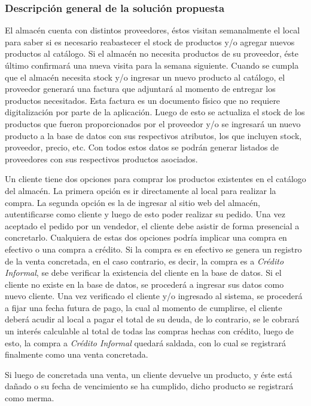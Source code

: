\documentclass[letterpaper,12pt]{article}
\begin{document}
\newpage

\subsubsection{Descripción general de la solución propuesta}

El almacén cuenta con distintos proveedores, éstos visitan semanalmente el local para saber si es necesario reabastecer el stock de 
productos y/o  agregar nuevos productos al catálogo. Si el almacén no necesita productos de su proveedor, éste último confirmará
una nueva visita para la semana siguiente. Cuando se cumpla que el almacén necesita stock y/o ingresar un nuevo producto al 
catálogo, el proveedor generará una factura que adjuntará al momento de entregar los productos necesitados. Esta factura es 
un documento físico que no requiere digitalización por parte de la aplicación. Luego de esto se actualiza el stock de los productos que 
fueron proporcionados por el proveedor y/o se ingresará un nuevo producto a la base de datos con sus respectivos atributos, los que 
incluyen stock, proveedor, precio, etc. Con todos estos datos se podrán generar listados de proveedores con sus respectivos productos 
asociados.

Un cliente tiene dos opciones para comprar los productos existentes en el catálogo del almacén. La primera opción es ir directamente
al local para realizar la compra. La segunda opción es la de ingresar al sitio web del almacén, autentificarse como cliente y luego de
esto poder realizar su pedido. Una vez aceptado el pedido por un vendedor, el cliente debe asistir de forma presencial a concretarlo. 
Cualquiera de estas dos opciones podría implicar una compra en efectivo o una compra a crédito. Si la compra es en efectivo se 
genera un registro de la venta concretada, en el caso contrario, es decir, la compra es a \emph{Crédito Informal}, se debe verificar
la existencia del cliente en la base de datos. Si el cliente no existe en la base de datos, se procederá a ingresar sus datos como 
nuevo cliente. Una vez verificado el cliente y/o ingresado al sistema, se procederá a fijar una fecha futura de pago, la cual al 
momento de cumplirse, el cliente deberá acudir al local a pagar el total de su deuda, de lo contrario, se le cobrará un interés calculable al total 
de todas las compras hechas con crédito, luego de esto, la compra a \emph{Crédito Informal} quedará saldada, con lo cual se 
registrará finalmente como una venta concretada.

Si luego de concretada una venta, un cliente devuelve un producto, y éste está dañado o su fecha de vencimiento se ha cumplido, dicho producto se registrará como merma.
\end{document}
